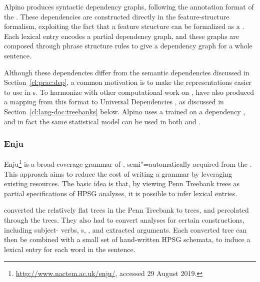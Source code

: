 \documentclass[output=paper
	        ,collection
	        ,collectionchapter
 	        ,biblatex
                ,babelshorthands
                ,newtxmath
                ,draftmode
                ,colorlinks, citecolor=brown
]{langscibook}
\begin{document}
Alpino produces syntactic dependency graphs,
following the annotation format of the  \citep{oostdijk2000corpus}.
These dependencies are constructed directly in the feature-structure formalism,
exploiting the fact that a feature structure can be formalized as a .
Each lexical entry encodes a partial dependency graph,
and these graphs are composed through phrase structure rules
to give a dependency graph for a whole sentence.

Although these dependencies differ from the semantic dependencies discussed in Section~\ref{cl:prac:dep},
a common motivation is to make the representations easier to use in s.
To harmonize with other computational work on ,
\citet{Bou:Van:17} have also produced a mapping from this format
to Universal Dependencies \citep[UD;][]{Niv:Mar:Gin:16},
as discussed in Section~\ref{cl:lang-doc:treebanks} below.
Alpino uses a  trained on a dependency ,
and in fact the same statistical model can be used in both  and 
\citep{dekok2011reversible}.

\subsubsection{Enju}
\label{cl:other:enju}


Enju\footnote{%
	\url{http://www.nactem.ac.uk/enju/}, accessed 29 August 2019.
} \citep{MNT2005a-u}
is a broad-coverage grammar of ,
semi"=automatically acquired from the  \citep{Mar:San:Mar:93}.
This approach aims to reduce the cost of writing a grammar
by leveraging existing resources.
The basic idea is that, by viewing Penn Treebank trees as partial specifications of HPSG analyses,
it is possible to infer lexical entries.

\citeauthor{MNT2005a-u} converted the relatively flat trees in the Penn Treebank to  trees,
and percolated  through the trees.
They also had to convert analyses for certain constructions,
including subject- verbs, s, , and extracted arguments.
Each converted tree can then be combined with a small set of hand-written HPSG schemata,
to induce a lexical entry for each word in the sentence.
\end{document}

